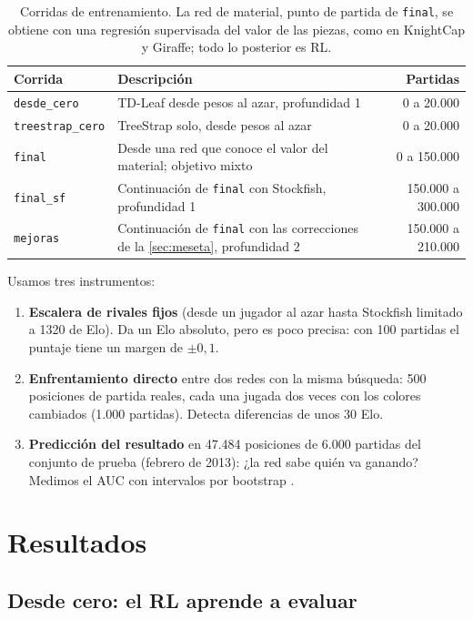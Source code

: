 \documentclass[11pt,a4paper]{article}
\begin{document}
\begin{table}[H]
\centering\small
\begin{tabularx}{\textwidth}{@{}l X r@{}}
\toprule
Corrida & Descripción & Partidas \\
\midrule
\texttt{desde\_cero} & TD-Leaf desde pesos al azar, profundidad 1 & 0 a 20.000 \\
\texttt{treestrap\_cero} & TreeStrap solo, desde pesos al azar & 0 a 20.000 \\
\texttt{final} & Desde una red que conoce el valor del material; objetivo mixto & 0 a 150.000 \\
\texttt{final\_sf} & Continuación de \texttt{final} con Stockfish, profundidad 1 & 150.000 a 300.000 \\
\texttt{mejoras} & Continuación de \texttt{final} con las correcciones de la \cref{sec:meseta}, profundidad 2 & 150.000 a 210.000 \\
\bottomrule
\end{tabularx}
\caption{Corridas de entrenamiento. La red de material, punto de partida de
\texttt{final}, se obtiene con una regresión supervisada del valor de las
piezas, como en KnightCap y Giraffe; todo lo posterior es RL.}
\label{tab:corridas}
\end{table}

Usamos tres instrumentos:
\begin{enumerate}
\item \textbf{Escalera de rivales fijos} (desde un jugador al azar hasta
  Stockfish limitado a 1320 de Elo). Da un Elo absoluto, pero es poco
  precisa: con 100 partidas el puntaje tiene un margen de $\pm0,1$.
\item \textbf{Enfrentamiento directo} entre dos redes con la misma búsqueda:
  500 posiciones de partida reales, cada una jugada dos veces con los colores
  cambiados (1.000 partidas). Detecta diferencias de unos 30 Elo.
\item \textbf{Predicción del resultado} en 47.484 posiciones de 6.000
  partidas del conjunto de prueba (febrero de 2013): ¿la red sabe quién va
  ganando? Medimos el AUC con intervalos por bootstrap \citep{efron1993}.
\end{enumerate}

\section{Resultados}

\subsection{Desde cero: el RL aprende a evaluar}
\label{sec:cero}
\end{document}
